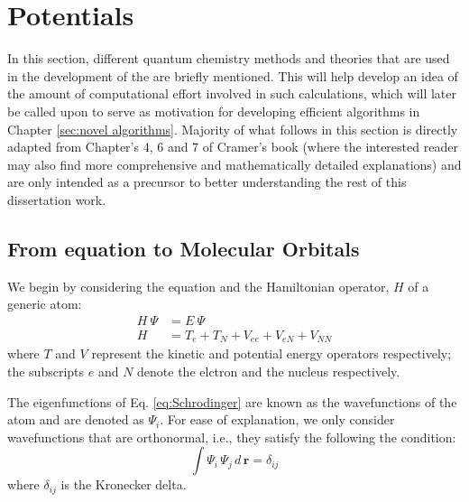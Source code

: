     \section{\AbInitio{} Potentials}
        In this section, different quantum chemistry methods and theories that are used in the development of the \abInitio{} \PESs{} are briefly mentioned. This will help develop an idea of the amount of computational effort involved in such calculations, which will later be called upon to serve as motivation for developing efficient algorithms in Chapter \ref{sec:novel algorithms}. Majority of what follows in this section is directly adapted from Chapter's 4, 6 and 7 of Cramer's book \cite{Cramer} (where the interested reader may also find more comprehensive and mathematically detailed explanations) and are only intended as a precursor to better understanding the rest of this dissertation work. \\
        \subsection{From \Schrodinger{} equation to Molecular Orbitals}
            We begin by considering the \Schrodinger{} equation and the Hamiltonian operator, $H$ of a generic atom:
            \begin{equation}\label{eq:Schrodinger}
                \begin{aligned}
                    H~\Psi &= E~\Psi \\
                    H &= T_e + T_N + V_{ee} + V_{eN} + V_{NN}
                \end{aligned}
            \end{equation}
            where $T$ and $V$ represent the kinetic and potential energy operators respectively; the subscripts $e$ and $N$ denote the elctron and the nucleus respectively.

            The eigenfunctions of Eq. \eqref{eq:Schrodinger} are known as the wavefunctions of the atom and are denoted as $\Psi_i$. For ease of explanation, we only consider wavefunctions that are orthonormal, i.e., they satisfy the following the condition:
            \begin{equation}\label{eq:orthonormality}
                \int \Psi_i\, \Psi_j\, d\, \mathbf{r} = \delta_{ij}
            \end{equation}
            where $\delta_{ij}$ is the Kronecker delta.

